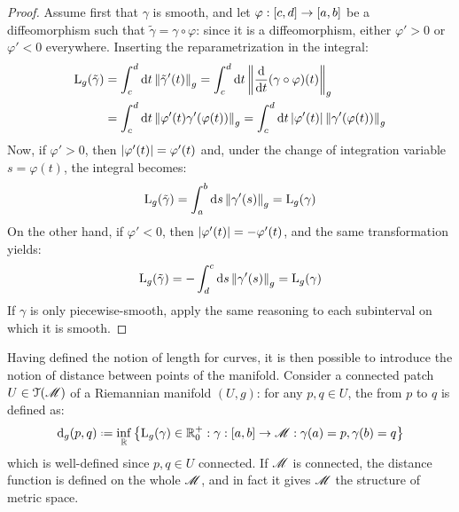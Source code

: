 \begin{proofbox}
  \begin{proof}
    Assume first that $ \gamma $ is smooth, and let $ \varphi : [c,d] \rightarrow [a,b] $ be a diffeomorphism such that $ \tilde{\gamma} = \gamma \circ \varphi $: since it is a diffeomorphism, either $ \varphi' > 0 $ or $ \varphi' < 0 $ everywhere. Inserting the reparametrization in the integral:
    \begin{equation*}
      \begin{split}
        \mathrm{L}_g(\tilde{\gamma})
        & = \int_c^d \mathrm{d} t \left\lVert\tilde{\gamma}'(t)\right\rVert_g = \int_c^d \mathrm{d} t \left\lVert\frac{\mathrm{d}}{\mathrm{d} t} (\gamma \circ \varphi)(t)\right\rVert_g \\
        & = \int_c^d \mathrm{d} t \left\lVert\varphi'(t) \gamma'(\varphi(t))\right\rVert_g = \int_c^d \mathrm{d} t \left\lvert\varphi'(t)\right\rvert \left\lVert\gamma'(\varphi(t))\right\rVert_g
      \end{split}
    \end{equation*}
    Now, if $ \varphi' > 0 $, then $ \left\lvert\varphi'(t)\right\rvert = \varphi'(t) $ and, under the change of integration variable $ s = \varphi(t) $, the integral becomes:
    \begin{equation*}
      \mathrm{L}_g(\tilde{\gamma}) = \int_a^b \mathrm{d} s \left\lVert\gamma'(s)\right\rVert_g = \mathrm{L}_g(\gamma)
    \end{equation*}
    On the other hand, if $ \varphi' < 0 $, then $ \left\lvert\varphi'(t)\right\rvert = - \varphi'(t) $, and the same transformation yields:
    \begin{equation*}
      \mathrm{L}_g(\tilde{\gamma}) = - \int_d^c \mathrm{d} s \left\lVert\gamma'(s)\right\rVert_g = \mathrm{L}_g(\gamma)
    \end{equation*}
    If $ \gamma $ is only piecewise-smooth, apply the same reasoning to each subinterval on which it is smooth.
  \end{proof}
\end{proofbox}

Having defined the notion of length for curves, it is then possible to introduce the notion of distance between points of the manifold. Consider a connected patch $ U \in \EuScript{T}(\mathscr{M}) $ of a Riemannian manifold $ (U,g) $: for any $ p,q \in U $, the  from $ p $ to $ q $ is defined as:
\begin{equation}
  \dist_g(p,q) \defeq \inf_\R \big\{ \lng_g(\gamma) \in \R^+_0 : \gamma : [a,b] \ra \man : \gamma(a) = p , \gamma(b) = q \big\}
\end{equation}
which is well-defined since $ p,q \in U $ connected. If $ \mathscr{M} $ is connected, the distance function is defined on the whole $ \mathscr{M} $, and in fact it gives $ \mathscr{M} $ the structure of metric space.

